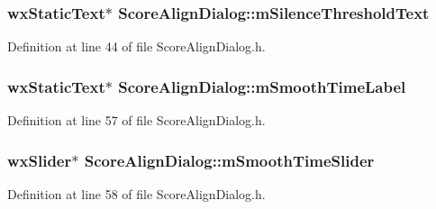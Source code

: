 \subsubsection[{\texorpdfstring{m\+Silence\+Threshold\+Text}{mSilenceThresholdText}}]{\setlength{\rightskip}{0pt plus 5cm}wx\+Static\+Text$\ast$ Score\+Align\+Dialog\+::m\+Silence\+Threshold\+Text}\hypertarget{class_score_align_dialog_a64ec976e4604069c0510f1aefa6b57f4}{}\label{class_score_align_dialog_a64ec976e4604069c0510f1aefa6b57f4}


Definition at line 44 of file Score\+Align\+Dialog.\+h.

\subsubsection[{\texorpdfstring{m\+Smooth\+Time\+Label}{mSmoothTimeLabel}}]{\setlength{\rightskip}{0pt plus 5cm}wx\+Static\+Text$\ast$ Score\+Align\+Dialog\+::m\+Smooth\+Time\+Label}\hypertarget{class_score_align_dialog_a8d78260d0fe77de8f95a775e6fa7b804}{}\label{class_score_align_dialog_a8d78260d0fe77de8f95a775e6fa7b804}


Definition at line 57 of file Score\+Align\+Dialog.\+h.

\subsubsection[{\texorpdfstring{m\+Smooth\+Time\+Slider}{mSmoothTimeSlider}}]{\setlength{\rightskip}{0pt plus 5cm}wx\+Slider$\ast$ Score\+Align\+Dialog\+::m\+Smooth\+Time\+Slider}\hypertarget{class_score_align_dialog_ad425f9986eb6b3dd2761185faeafc29e}{}\label{class_score_align_dialog_ad425f9986eb6b3dd2761185faeafc29e}


Definition at line 58 of file Score\+Align\+Dialog.\+h.

